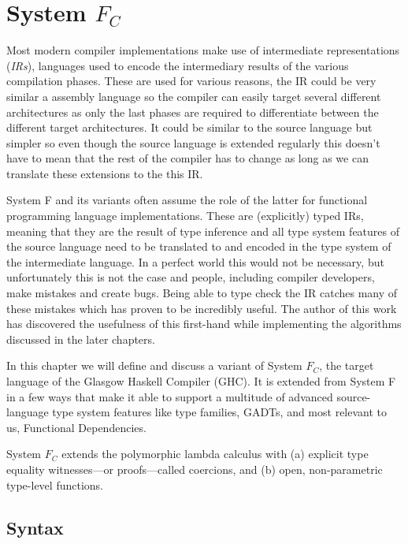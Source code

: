 \chapter{System $F_C$}
\label{cha:system-fc}

Most modern compiler implementations make use of intermediate representations
(\textit{IRs}), languages used to encode the intermediary results of the
various compilation phases. These are used for various reasons, the IR could be
very similar a assembly language so the compiler can easily target several
different architectures as only the last phases are required to differentiate
between the different target architectures. It could be similar to the source
language but simpler so even though the source language is extended regularly
this doesn't have to mean that the rest of the compiler has to change as long as
we can translate these extensions to the this IR.

System F and its variants often assume the role of the latter for functional
programming language implementations. These are (explicitly) typed IRs, meaning
that they are the result of type inference and all type system features of the
source language need to be translated to and encoded in the type system of the
intermediate language. In a perfect world this would not be necessary, but
unfortunately this is not the case and people, including compiler developers,
make mistakes and create bugs. Being able to type check the IR catches many of
these mistakes which has proven to be incredibly useful. The author of this work
has discovered the usefulness of this first-hand while implementing the
algorithms discussed in the later chapters.

In this chapter we will define and discuss a variant of System $F_C$, the    %
target language of the Glasgow Haskell Compiler (GHC). It is extended from System F in a few ways that
make it able to support a multitude of advanced source-language type
system features like type families, GADTs, and most relevant to us, Functional
Dependencies.

System $F_C$ extends the polymorphic lambda calculus with (a) explicit type equality
witnesses---or proofs---called coercions, and (b) open, non-parametric type-level functions.

\section{Syntax}

